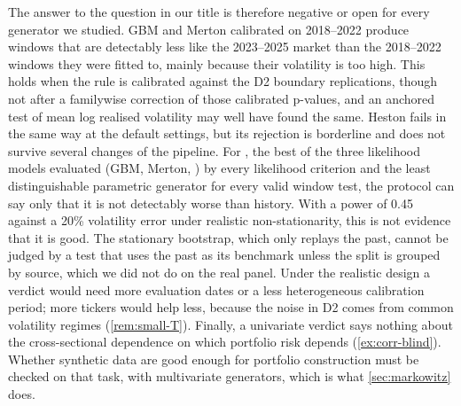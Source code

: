 The answer to the question in our title is therefore negative or open for every generator we
studied. GBM and Merton calibrated on 2018--2022 produce windows that are detectably less like
the 2023--2025 market than the 2018--2022 windows they were fitted to, mainly because their
volatility is too high. This holds when the rule is calibrated against the D2 boundary
replications, though not after a familywise correction of those calibrated p-values, and an
anchored test of mean log realised volatility may well have found the same. Heston fails in the same
way at the default settings, but its rejection is borderline and does not survive several
changes of the pipeline. For \GARCHt{}, the best of the three likelihood models evaluated (GBM,
Merton, \GARCHt{}) by every likelihood criterion and the least distinguishable parametric generator
for every valid window test, the protocol can say
only that it is not detectably worse than history. With a power of 0.45 against a 20\%
volatility error under realistic non-stationarity, this is not evidence that it is good. The
stationary bootstrap, which only replays the past, cannot be judged by a test that uses the past
as its benchmark unless the split is grouped by source, which we did not do on the real panel.
Under the realistic design a \GOOD{} verdict would need more evaluation dates
or a less heterogeneous calibration period; more tickers would help less, because the noise in
D2 comes from common volatility regimes (\cref{rem:small-T}). Finally, a univariate verdict says
nothing about the cross-sectional dependence on which portfolio risk depends
(\cref{ex:corr-blind}). Whether synthetic data are good enough for portfolio construction must be
checked on that task, with multivariate generators, which is what \cref{sec:markowitz} does.

\begin{table}[tbp]
  \centering
  \caption{Verdicts (E3, decision rule \eqref{eq:verdict}, $\alpha=0.05$, $\bmin=0.8$). 100
    tickers, $L=20$, five synthetic seeds; $\pmed=\min\{1,2\med_sp_s\}$ of the Driscoll--Kraay
    p-values; seeds rej.: seeds with $p_s\le0.05$. Anchored relative test against the 6200 real
    \TRAIN{} windows; $\Danc$ \eqref{eq:anchored-stat}: median and range over seeds. D2-cal.\
    $p$: Monte Carlo p-value $(1+\#\{\pmed^{(r)}\le\pmed\})/101$ of the observed anchored $\pmed$
    against the rule p-values $\pmed^{(r)}$ of the 100 boundary replications of design D2, an
    approximate calibration (\cref{sec:emp-verdicts}). Power of the
    rule (minimum over designs D1 and D2): $\hat\beta=0.45$ [0.36, 0.55] (D2, Wilson 95\%),
    $\betaL=0.37$; boundary size of the rule: 0.00 (D1) and 0.08 [0.04, 0.15] (D2,
    Clopper--Pearson 95\%); see \cref{tab:e3-power}. Last column: verdict with the
    Clopper--Pearson lower bound $\betaL$ in place of $\hat\beta$. $^{\ddagger}$Relative test
    invalid for the stationary bootstrap (no verdict).}
  \label{tab:e3-verdicts}
  \small
\end{table}
